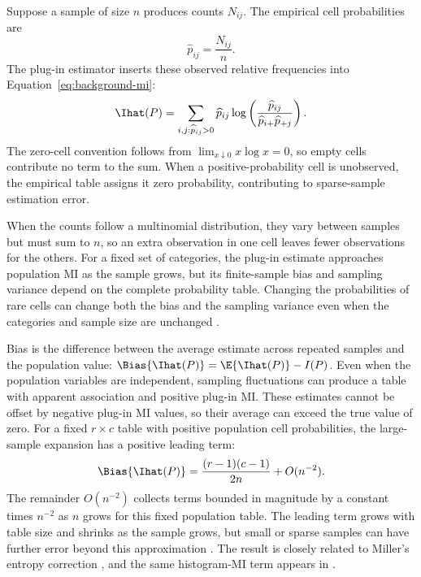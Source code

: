 Suppose a sample of size \(n\) produces counts \(N_{ij}\). The empirical cell
probabilities are
\begin{equation}
  \widehat p_{ij}=\frac{N_{ij}}{n}.
\end{equation}
The plug-in estimator inserts these observed relative frequencies into
Equation~\eqref{eq:background-mi}:
\begin{equation}
  \Ihat(P)
  =\sum_{i,j:\widehat p_{ij}>0}
  \widehat p_{ij}
  \log\left(
  \frac{\widehat p_{ij}}
       {\widehat p_{i+}\widehat p_{+j}}
  \right).
  \label{eq:plugin-mi-background}
\end{equation}
The zero-cell convention follows from
\(\lim_{x\downarrow0}x\log x=0\), so empty cells contribute no term to
the sum. When a positive-probability cell is unobserved, the empirical
table assigns it zero probability, contributing to sparse-sample estimation
error.

When the counts follow a multinomial distribution, they vary between samples
but must sum to \(n\), so an extra observation in one cell leaves fewer
observations for the others. For a fixed set of categories, the plug-in
estimate approaches population MI as the sample grows, but its finite-sample
bias and sampling variance depend on the complete probability table.
Changing the probabilities of rare cells can change both the bias and the
sampling variance even when the categories and sample size are unchanged
\citep{paninski2003}.

Bias is the difference between the average estimate across repeated samples
and the population value:
\(\Bias\{\Ihat(P)\}=\E\{\Ihat(P)\}-I(P)\).
Even when the population variables are independent, sampling fluctuations
can produce a table with apparent association and positive plug-in MI.
These estimates cannot be offset by negative plug-in MI values, so their
average can exceed the true value of zero.
For a fixed \(r\times c\) table with positive population cell probabilities,
the large-sample expansion has a positive leading term:
\begin{equation}
  \Bias\{\Ihat(P)\}
  =\frac{(r-1)(c-1)}{2n}+O(n^{-2}).
  \label{eq:mi-leading-bias}
\end{equation}
The remainder \(O(n^{-2})\) collects terms bounded in magnitude by a
constant times \(n^{-2}\) as \(n\) grows for this fixed population table.
The leading term grows with table size and shrinks as the sample grows,
but small or sparse samples can have further error beyond this approximation
\citep{paninski2003}. The result is closely related to Miller's entropy
correction \citep{miller1955}, and the same histogram-MI term appears in
\citet{moddemeijer1989}.

